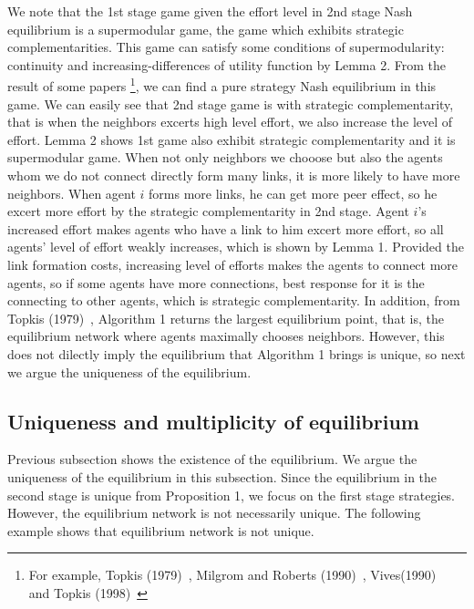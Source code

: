 \documentclass[12pt]{article}
\theoremstyle{definition}
\begin{document}
We note that the 1st stage game given the effort level in 2nd stage Nash equilibrium is a supermodular game, the game which exhibits strategic complementarities.
This game can satisfy some conditions of supermodularity: continuity and increasing-differences of utility function by Lemma 2.
From the result of some papers \footnote{For example, Topkis (1979)~\cite{topkis1979}, Milgrom and Roberts (1990)~\cite{milgromroberts}, Vives(1990)~\cite{vives} and Topkis (1998)~\cite{topkis1998}}, we can find a pure strategy Nash equilibrium in this game.
We can easily see that 2nd stage game is with strategic complementarity, that is when the neighbors excerts high level effort, we also increase the level of effort.
Lemma 2 shows 1st game also exhibit strategic complementarity and it is supermodular game.
When not only neighbors we chooose but also the agents whom we do not connect directly form many links, it is more likely to have more neighbors.
When agent $i$ forms more links, he can get more peer effect, so he excert more effort by the strategic complementarity in 2nd stage.
Agent $i$'s increased effort makes agents who have a link to him excert more effort, so all agents' level of effort weakly increases, which is shown by Lemma 1.
Provided the link formation costs, increasing level of efforts makes the agents to connect more agents, so if some agents have more connections, best response for it is the connecting to other agents, which is strategic complementarity.
In addition, from Topkis (1979)~\cite{topkis1979}, Algorithm 1 returns the largest equilibrium point, that is, the equilibrium network where agents maximally chooses neighbors.
However, this does not dilectly imply the equilibrium that Algorithm 1 brings is unique, so next we argue the uniqueness of the equilibrium.


\subsection{Uniqueness and multiplicity of equilibrium}

Previous subsection shows the existence of the equilibrium.
We argue the uniqueness of the equilibrium in this subsection.
Since the equilibrium in the second stage is unique from Proposition 1, we focus on the first stage strategies.
However, the equilibrium network is not necessarily unique.
The following example shows that equilibrium network is not unique.
\end{document}
